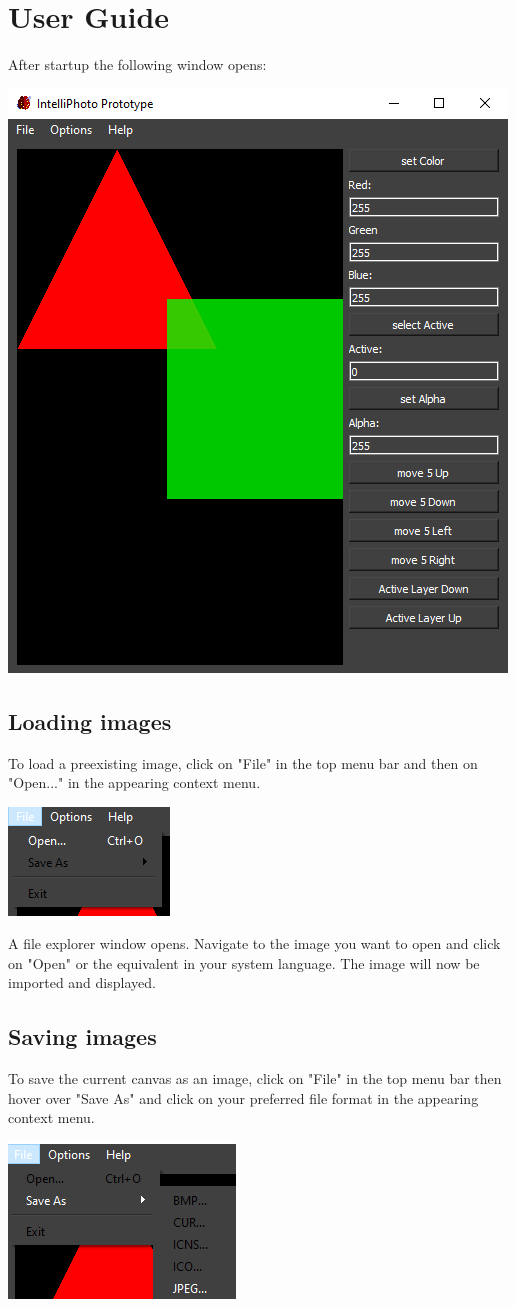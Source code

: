 \documentclass[a4paper, 12pt]{article}
\begin{document}
\section{User Guide}
After startup the following window opens:
\begin{center}
\includegraphics[width=0.5\linewidth,keepaspectratio]{assets/startup}
\end{center}

\subsection{Loading images}

To load a preexisting image, click on "File" in the top menu bar and then on "Open..." in the appearing context menu.
\begin{center}
\includegraphics[width=0.3\linewidth,keepaspectratio]{assets/file-open}
\end{center}

A file explorer window opens. Navigate to the image you want to open and click on "Open" or the equivalent in your system language. The image will now be imported and displayed.

\subsection{Saving images}
To save the current canvas as an image, click on "File" in the top menu bar then hover over "Save As" and click on your preferred file format in the appearing context menu.
\begin{center}
\includegraphics[width=0.3\linewidth,keepaspectratio]{assets/file-save}
\end{center}
\end{document}
